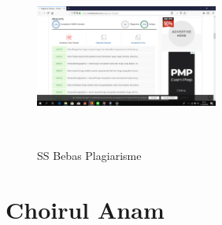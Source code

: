 \begin{figure}[!Htbp]
\centering
\includegraphics[width=6cm,height=6cm]{figures/Wiyul.png}
\caption{SS Bebas Plagiarisme}
\label{dwiyul}
\end{figure}


\section{Choirul Anam}
